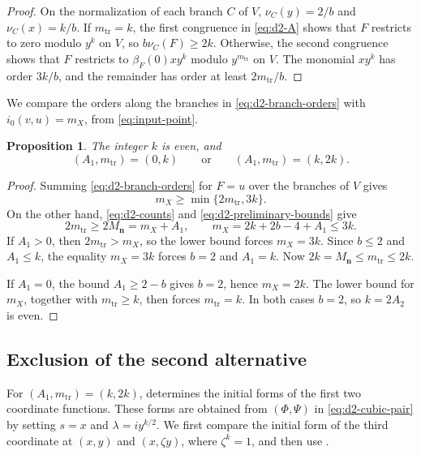 \documentclass[11pt,letterpaper]{article}
\numberwithin{equation}{section}
\newtheorem{proposition}[proposition]{Proposition}
\theoremstyle{remark}
\theoremstyle{plain}
\begin{document}
\begin{proof}
On the normalization of each branch $C$ of $V$,
$\nu_C(y)=2/b$ and $\nu_C(x)=k/b$.
If $m_{\mathrm{tr}}=k$, the first congruence in \eqref{eq:d2-A}
shows that $F$ restricts to zero modulo $y^k$ on $V$, so $b\nu_C(F)\geq2k$.
Otherwise, the second congruence shows that $F$ restricts to
$\beta_F(0)xy^k$ modulo $y^{m_{\mathrm{tr}}}$ on $V$.
The monomial $xy^k$ has order $3k/b$, and the remainder has order at least
$2m_{\mathrm{tr}}/b$.
\end{proof}

We compare the orders along the branches in \eqref{eq:d2-branch-orders} with
$i_0(v,u)=m_X$, from \eqref{eq:input-point}.

\begin{proposition}
\label{prop:d2-numerical}
The integer $k$ is even, and
\[
 (A_1,m_{\mathrm{tr}})=(0,k)\qquad\text{or}\qquad
 (A_1,m_{\mathrm{tr}})=(k,2k).
\]
\end{proposition}

\begin{proof}
Summing \eqref{eq:d2-branch-orders} for $F=u$ over the branches of $V$ gives
\[
 m_X\geq\min\{2m_{\mathrm{tr}},3k\}.
\]
On the other hand, \eqref{eq:d2-counts} and
\eqref{eq:d2-preliminary-bounds} give
\[
 2m_{\mathrm{tr}}\geq2M_{\boldsymbol n}=m_X+A_1,\qquad
 m_X=2k+2b-4+A_1\leq3k.
\]
If $A_1>0$, then $2m_{\mathrm{tr}}>m_X$, so the lower bound
forces $m_X=3k$.  Since $b\leq2$ and $A_1\leq k$, the equality $m_X=3k$ forces
$b=2$ and $A_1=k$.  Now
$2k=M_{\boldsymbol n}\leq m_{\mathrm{tr}}\leq2k$.

If $A_1=0$, the bound $A_1\geq2-b$ gives $b=2$, hence $m_X=2k$.
The lower bound for $m_X$, together with $m_{\mathrm{tr}}\geq k$,
then forces $m_{\mathrm{tr}}=k$.
In both cases $b=2$, so $k=2A_2$ is even.
\end{proof}

\subsection{Exclusion of the second alternative}

For $(A_1,m_{\mathrm{tr}})=(k,2k)$,
 determines the initial forms of the first two
coordinate functions.  These forms are obtained from $(\Phi,\Psi)$ in
\eqref{eq:d2-cubic-pair} by setting $s=x$ and $\lambda=iy^{k/2}$.
We first compare the initial form of the third coordinate at $(x,y)$ and
$(x,\zeta y)$, where $\zeta^k=1$, and then use
.
\end{document}
